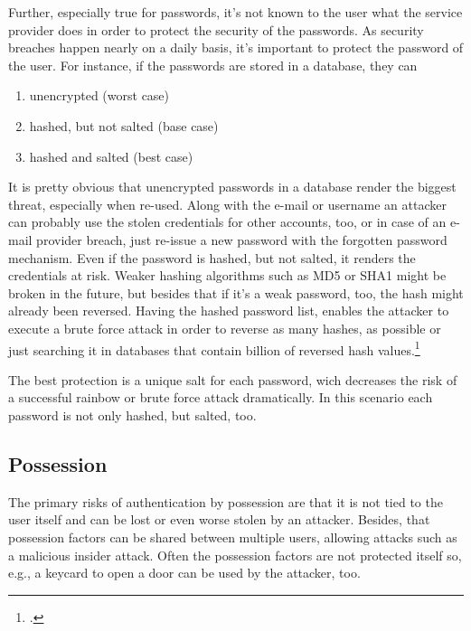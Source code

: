 Further, especially true for passwords, it's not known to the user what the service provider does in order to protect the security of the passwords. As security breaches happen nearly on a daily basis, it's important to protect the password of the user. For instance, if the passwords are stored in a database, they can

\begin{enumerate}[label=(\alph*)]
	\item unencrypted (worst case)
	\item hashed, but not salted (base case)
	\item hashed and salted (best case)
\end{enumerate}

It is pretty obvious that unencrypted passwords in a database render the biggest threat, especially when re-used. Along with the e-mail or username an attacker can probably use the stolen credentials for other accounts, too, or in case of an e-mail provider breach, just re-issue a new password with the \flqq forgotten password \frqq{} mechanism. Even if the password is hashed, but not salted, it renders the credentials at risk. Weaker hashing algorithms such as MD5 or SHA1 might be broken in the future, but besides that if it's a weak password, too, the hash might already been reversed. Having the hashed password list, enables the attacker to execute a brute force attack in order to reverse as many hashes, as possible or just searching it in databases that contain billion of reversed hash values.\footcites[See][1425]{Thomas:2017:DBP:3133956.3134067}

The best protection is a unique salt for each password, wich decreases the risk of a successful rainbow or brute force attack dramatically. In this scenario each password is not only hashed, but salted, too.

	
\subsection{Possession}
\label{subsec:possession-threat}

The primary risks of authentication by possession are that it is not tied to the user itself and can be lost or even worse stolen by an attacker. Besides, that possession factors can be shared between multiple users, allowing attacks such as a malicious insider attack. Often the possession factors are not protected itself so, e.g., a keycard to open a door can be used by the attacker, too.

